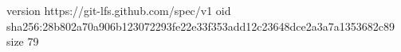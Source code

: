 version https://git-lfs.github.com/spec/v1
oid sha256:28b802a70a906b123072293fe22e33f353add12c23648dce2a3a7a1353682c89
size 79
